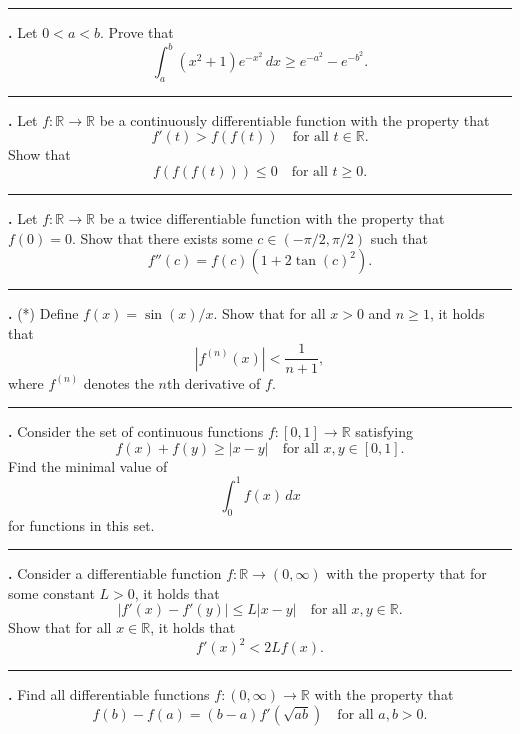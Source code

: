 \documentclass[11pt]{article}
\newcounter{probnum}
\newenvironment{problembox}{\par\noindent\rule{\linewidth}{0.5pt}\vspace{5pt}\par}{\vspace{2pt}}
\begin{document}
\begin{problembox}
\textbf{\theprobnum.} Let $0 < a < b$. Prove that
\[
\int_a^b (x^2+1) e^{-x^2}\,dx \ge e^{-a^2} - e^{-b^2}.
\]
\end{problembox}

\begin{problembox}
\textbf{\theprobnum.} Let $f : \mathbb{R} \to \mathbb{R}$ be a continuously differentiable function with the property that
\[
f'(t) > f(f(t)) \quad \text{for all } t \in \mathbb{R}.
\]
Show that
\[
f(f(f(t))) \le 0 \quad \text{for all } t \ge 0.
\]
\end{problembox}

\begin{problembox}
\textbf{\theprobnum.} Let $f : \mathbb{R} \to \mathbb{R}$ be a twice differentiable function with the property that $f(0) = 0$. Show that there exists some $c \in (-\pi/2, \pi/2)$ such that
\[
f''(c) = f(c)(1 + 2\tan(c)^2).
\]
\end{problembox}

\begin{problembox}
\textbf{\theprobnum.} (*) Define $f(x) = \sin(x)/x$. Show that for all $x > 0$ and $n \ge 1$, it holds that
\[
|f^{(n)}(x)| < \frac{1}{n+1},
\]
where $f^{(n)}$ denotes the $n$th derivative of $f$.
\end{problembox}

\begin{problembox}
\textbf{\theprobnum.} Consider the set of continuous functions $f : [0,1] \to \mathbb{R}$ satisfying
\[
f(x) + f(y) \ge |x-y| \quad \text{for all } x, y \in [0,1].
\]
Find the minimal value of
\[
\int_0^1 f(x)\,dx
\]
for functions in this set.
\end{problembox}

\begin{problembox}
\textbf{\theprobnum.} Consider a differentiable function $f : \mathbb{R} \to (0,\infty)$ with the property that for some constant $L > 0$, it holds that
\[
|f'(x) - f'(y)| \le L|x-y| \quad \text{for all } x, y \in \mathbb{R}.
\]
Show that for all $x \in \mathbb{R}$, it holds that
\[
f'(x)^2 < 2Lf(x).
\]
\end{problembox}

\begin{problembox}
\textbf{\theprobnum.} Find all differentiable functions $f : (0,\infty) \to \mathbb{R}$ with the property that
\[
f(b) - f(a) = (b-a) f'(\sqrt{ab}) \quad \text{for all } a, b > 0.
\]
\end{problembox}
\end{document}
